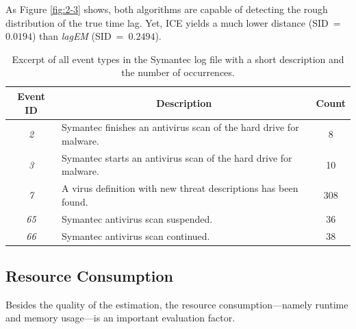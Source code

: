 \documentclass[conference]{IEEEtran}
\theoremstyle{examplestyle}
\begin{document}
As Figure \ref{fig:2-3} shows, both algorithms are capable of detecting the rough distribution of the true time lag. Yet, \ac{ICE} yields a much lower distance (\ac{SID}~=~$0.0194$) than \textit{lagEM} (\ac{SID}~=~$0.2494$).


\begin{table}[!tb]
	\caption{Excerpt of all event types in the Symantec log file with a short description and the number of occurrences.}
	\label{tbl:symantecEvents}

	\centering
	\begin{tabular}{c p{} c}
		\textbf{Event ID} & \multicolumn{1}{c}{\textbf{Description}} & \textbf{Count} \\
		\hline
		\textit{2}	& Symantec finishes an antivirus scan of the hard drive for malware. & 8 \\
		\textit{3}	& Symantec starts an antivirus scan of the hard drive for malware. & 10 \\
		\textit{7}	& A virus definition with new threat descriptions has been found. & 308 \\
		\textit{65}	& Symantec antivirus scan suspended. & 36 \\
		\textit{66}	& Symantec antivirus scan continued. & 38 \\
	\end{tabular}

\end{table}


\subsection{Resource Consumption}
Besides the quality of the estimation, the resource consumption---namely runtime and memory usage---is an important evaluation factor. 
\end{document}
